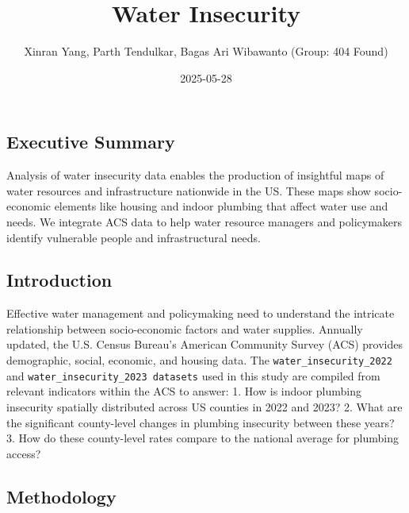 \documentclass[
  letterpaper,
  DIV=11,
  numbers=noendperiod]{scrartcl}
\title{Water Insecurity}
\author{Xinran Yang, Parth Tendulkar, Bagas Ari Wibawanto (Group: 404
Found)}
\date{2025-05-28}
\renewcommand*\contentsname{Table of contents}
\newcommand\contentsname{Table of contents}
\begin{document}
\maketitle
\ifdefined\Shaded\renewenvironment{Shaded}{\begin{tcolorbox}[frame hidden, breakable, interior hidden, enhanced, boxrule=0pt, borderline west={3pt}{0pt}{shadecolor}, sharp corners]}{\end{tcolorbox}}\fi

\renewcommand*\contentsname{Table of contents}
{
\hypersetup{linkcolor=}
\setcounter{tocdepth}{2}
\tableofcontents
}
\hypertarget{executive-summary}{%
\subsection{Executive Summary}\label{executive-summary}}

Analysis of water insecurity data enables the production of insightful
maps of water resources and infrastructure nationwide in the US. These
maps show socio-economic elements like housing and indoor plumbing that
affect water use and needs. We integrate ACS data to help water resource
managers and policymakers identify vulnerable people and infrastructural
needs.

\hypertarget{introduction}{%
\subsection{Introduction}\label{introduction}}

Effective water management and policymaking need to understand the
intricate relationship between socio-economic factors and water
supplies. Annually updated, the U.S. Census Bureau's American Community
Survey (ACS) provides demographic, social, economic, and housing data.
The \texttt{water\_insecurity\_2022} and
\texttt{water\_insecurity\_2023\ datasets} used in this study are
compiled from relevant indicators within the ACS to answer: 1. How is
indoor plumbing insecurity spatially distributed across US counties in
2022 and 2023? 2. What are the significant county-level changes in
plumbing insecurity between these years? 3. How do these county-level
rates compare to the national average for plumbing access?

\hypertarget{methodology}{%
\subsection{Methodology}\label{methodology}}
\end{document}
